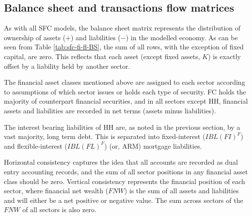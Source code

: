 \documentclass[
]{book}
\begin{document}
\hypertarget{sec:fi-fl-sfc-model-tables}{%
\subsection{Balance sheet and transactions flow matrices}\label{sec:fi-fl-sfc-model-tables}}

As with all SFC models, the balance sheet matrix represents the distribution
of ownership of assets (\(+\)) and liabilities (\(-\)) in the modelled economy. As can be seen
from Table \ref{tab:sfc-fi-fl-BS}, the sum of all rows, with the exception of fixed capital, are zero. This reflects that each asset (except fixed assets, \(K\)) is exactly offset by a liability held by another sector.

The financial asset classes mentioned above are assigned to each sector according to assumptions of which sector issues or holds each type of security. FC holds the majority of counterpart financial securities, and in all sectors except HH, financial assets and liabilities are recorded in net terms (assets minus liabilities).

The interest bearing liabilities of HH are, as noted in the previous section, by a vast majority, long term debt. This is separated into fixed-interest (\(IBL(FI)^F\)) and flexible-interest (\(IBL(FL)^F\)) (or, ARM) mortgage liabilities.

Horizontal consistency captures the idea that all accounts are recorded as dual entry
accounting records, and the sum of all sector positions in any financial asset class should be zero. Vertical consistency represents the financial position of each sector, where financial net wealth (\(FNW\)) is the sum of all assets and liabilities and will either be a net positive or negative value. The sum across sectors of the \(FNW\) of all sectors is also zero.
\end{document}
